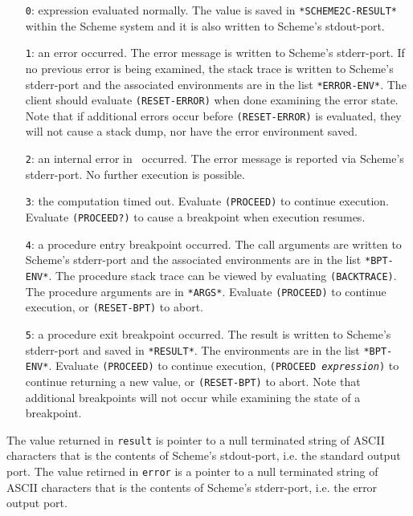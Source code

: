 \documentclass[12pt]{article}
\begin{document}
\begin{itemize}
\item[\texttt{0}:] expression evaluated normally.  The value is saved
  in \texttt{*SCHEME2C-RESULT*} within the Scheme system and it is
  also written to Scheme's stdout-port.

\item[\texttt{1}:] an error occurred.  The error message is written to
  Scheme's stderr-port.  If no previous error is being examined, the
  stack trace is written to Scheme's stderr-port and the associated
  environments are in the list \texttt{*ERROR-ENV*}.  The client
  should evaluate \texttt{(RESET-ERROR)} when done examining the error
  state.  Note that if additional errors occur before
  \texttt{(RESET-ERROR)} is evaluated, they will not cause a stack
  dump, nor have the error environment saved.

\item[\texttt{2}:] an internal error in \StoC\ occurred.  The error
  message is reported via Scheme's stderr-port.  No further execution
  is possible.

\item[\texttt{3}:] the computation timed out.  Evaluate
  \texttt{(PROCEED)} to continue execution.  Evaluate
  \texttt{(PROCEED?)} to cause a breakpoint when execution resumes.

\item[\texttt{4}:] a procedure entry breakpoint occurred.  The call
  arguments are written to Scheme's stderr-port and the associated
  environments are in the list \texttt{*BPT-ENV*}. The procedure stack
  trace can be viewed by evaluating \texttt{(BACKTRACE)}.  The
  procedure arguments are in \texttt{*ARGS*}. Evaluate
  \texttt{(PROCEED)} to continue execution, or \texttt{(RESET-BPT)} to
  abort.

\item[\texttt{5}:] a procedure exit breakpoint occurred.  The result
  is written to Scheme's stderr-port and saved in \texttt{*RESULT*}.
  The environments are in the list \texttt{*BPT-ENV*}.  Evaluate
  \texttt{(PROCEED)} to continue execution, \texttt{(PROCEED
    \textnormal{\emph{expression}})} to continue returning a new
  value, or \texttt{(RESET-BPT)} to abort.  Note that additional
  breakpoints will not occur while examining the state of a
  breakpoint.
\end{itemize}

The value returned in \texttt{result} is pointer to a null terminated
string of ASCII characters that is the contents of Scheme's
stdout-port, i.e. the standard output port.  The value retirned in
\texttt{error} is a pointer to a null terminated string of ASCII
characters that is the contents of Scheme's stderr-port, i.e. the
error output port.
\end{document}
